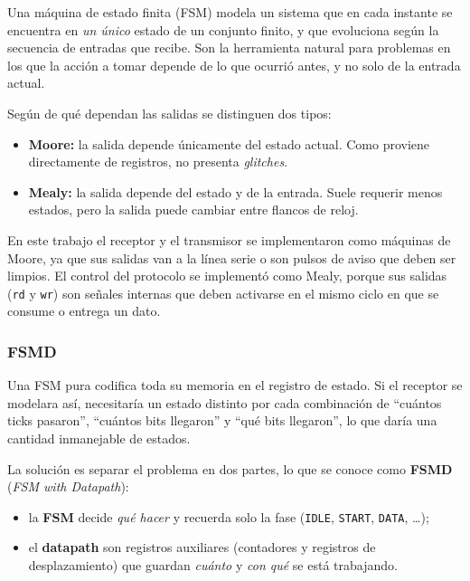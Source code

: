 \documentclass[12pt,a4paper]{article}
\begin{document}
Una máquina de estado finita (FSM) modela un sistema que en cada instante se
encuentra en \emph{un único} estado de un conjunto finito, y que evoluciona
según la secuencia de entradas que recibe. Son la herramienta natural para
problemas en los que la acción a tomar depende de lo que ocurrió antes, y no
solo de la entrada actual.

Según de qué dependan las salidas se distinguen dos tipos:

\begin{itemize}[nosep]
  \item \textbf{Moore:} la salida depende únicamente del estado actual. Como
        proviene directamente de registros, no presenta \emph{glitches}.
  \item \textbf{Mealy:} la salida depende del estado y de la entrada. Suele
        requerir menos estados, pero la salida puede cambiar entre flancos de
        reloj.
\end{itemize}

En este trabajo el receptor y el transmisor se implementaron como máquinas de
Moore, ya que sus salidas van a la línea serie o son pulsos de aviso que deben
ser limpios. El control del protocolo se implementó como Mealy, porque sus
salidas (\texttt{rd} y \texttt{wr}) son señales internas que deben activarse en
el mismo ciclo en que se consume o entrega un dato.

\subsubsection{FSMD}

Una FSM pura codifica toda su memoria en el registro de estado. Si el receptor
se modelara así, necesitaría un estado distinto por cada combinación de
``cuántos ticks pasaron'', ``cuántos bits llegaron'' y ``qué bits llegaron'',
lo que daría una cantidad inmanejable de estados.

La solución es separar el problema en dos partes, lo que se conoce como
\textbf{FSMD} (\emph{FSM with Datapath}):

\begin{itemize}[nosep]
  \item la \textbf{FSM} decide \emph{qué hacer} y recuerda solo la fase
        (\texttt{IDLE}, \texttt{START}, \texttt{DATA}, \ldots);
  \item el \textbf{datapath} son registros auxiliares (contadores y registros de
        desplazamiento) que guardan \emph{cuánto} y \emph{con qué} se está
        trabajando.
\end{itemize}
\end{document}
